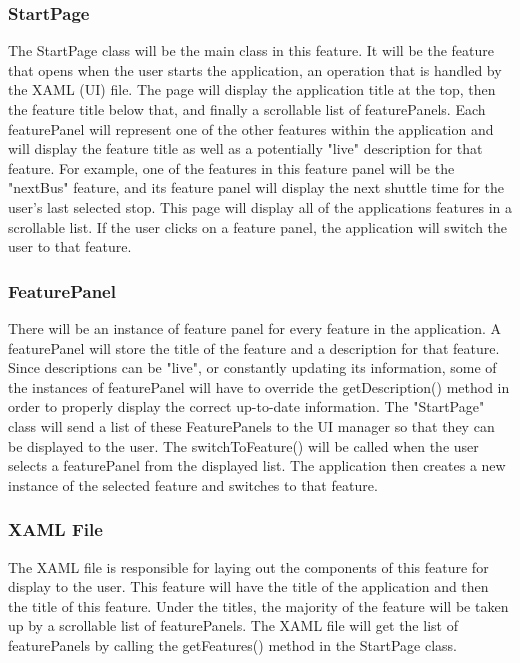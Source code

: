\documentclass[pdftex,12pt,letter]{article}
\begin{document}
\subsubsection{StartPage}
The StartPage class will be the main class in this feature. It will be the feature that opens when the user starts the application, an operation that is handled by the XAML (UI) file. The page will display the application title at the top, then the feature title below that, and finally a scrollable list of featurePanels. Each featurePanel will represent one of the other features within the application and will display the feature title as well as a potentially "live" description for that feature. For example, one of the features in this feature panel will be the "nextBus" feature, and its feature panel will display the next shuttle time for the user's last selected stop. This page will display all of the applications features in a scrollable list. If the user clicks on a feature panel, the application will switch the user to that feature.
\subsubsection{FeaturePanel}
There will be an instance of feature panel for every feature in the application. A featurePanel will store the title of the feature and a description for that feature. Since descriptions can be "live", or constantly updating its information, some of the instances of featurePanel will have to override the getDescription() method in order to properly display the correct up-to-date information. The "StartPage" class will send a list of these FeaturePanels to the UI manager so that they can be displayed to the user. The switchToFeature() will be called when the user selects a featurePanel from the displayed list. The application then creates a new instance of the selected feature and switches to that feature.
\subsubsection{XAML File}
The XAML file is responsible for laying out the components of this feature for display to the user. This feature will have the title of the application and then the title of this feature. Under the titles, the majority of the feature will be taken up by a scrollable list of featurePanels. The XAML file will get the list of featurePanels by calling the getFeatures() method in the StartPage class. 
\end{document}
